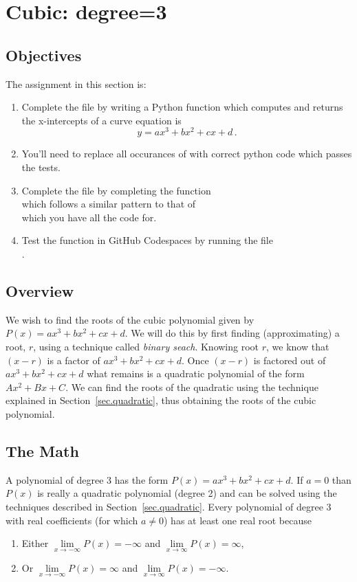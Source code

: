 \section{Cubic: degree=3}
\label{sec.cubic}

\subsection{Objectives}
The assignment in this section is:
\begin{enumerate}
\item Complete the file  by writing a Python
  function which computes and returns the x-intercepts of a curve
  equation is \[y=a x^3 + b x^2 + c x + d\,.\]
\item You'll need to replace all occurances of 
  with correct python code which passes the tests.

\item Complete the file  by completing the function \\
  which follows a similar pattern to that of \\
   which you have all the code for.

\item Test the function in GitHub Codespaces by running the file\\
  .
\end{enumerate}

\subsection{Overview}

We wish to find the roots of the cubic polynomial given by $P(x) = a
x^3 + b x^2 + c x + d$.  We will do this by first finding
(approximating) a root, $r$, using a technique called \emph{binary
seach}.  Knowing root $r$, we know that $(x-r)$ is a factor of $a x^3
+ b x^2 + c x + d$.  Once $(x-r)$ is factored out of $a x^3 + b x^2 + c x + d$
what remains is a quadratic polynomial of the form $A x^2 + Bx + C$.
We can find the roots of the quadratic using the technique
explained in Section~\ref{sec.quadratic}, thus obtaining the roots of
the cubic polynomial.


\subsection{The Math}
\label{sec.cubic.math}
A polynomial of degree 3 has the form $P(x) = a x^3 + b x^2 + c x +d$.
If $a=0$ than $P(x)$ is really a quadratic polynomial (degree 2)
and can be solved using the techniques described in
Section~\ref{sec.quadratic}.  Every polynomial of degree 3 with real
coefficients (for which $a\neq 0$) has at least one real root because
\begin{enumerate}
\item Either $\lim\limits_{x\to-\infty}P(x) = -\infty$ and $\lim\limits_{x\to\infty}P(x) = \infty$,
  \item Or $\lim\limits_{x\to-\infty}P(x) = \infty$ and $\lim\limits_{x\to\infty}P(x) = -\infty$.
\end{enumerate}


